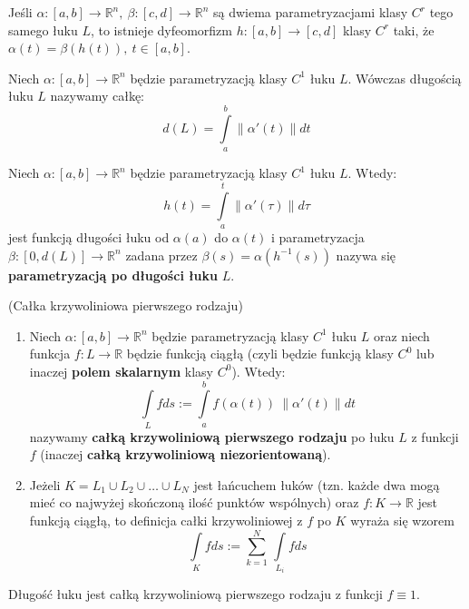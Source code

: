 \begin{tw}
	Jeśli $\alpha:[a,b]\rightarrow \mathbb{R}^{n},\ \beta:[c,d]\rightarrow \mathbb{R}^{n}$ są dwiema parametryzacjami klasy $C^{r}$ tego samego łuku $L$, to istnieje dyfeomorfizm $h:[a,b]\rightarrow [c,d]$ klasy $C^{r}$ taki, że $\alpha(t)=\beta(h(t)),\ t\in [a,b]$.
\end{tw}

\begin{tw}
	Niech $\alpha:[a,b]\rightarrow \mathbb{R}^{n}$ będzie parametryzacją klasy $C^{1}$ łuku $L$. Wówczas długością łuku $L$ nazywamy całkę: $$d(L)=\int\limits_{a}^{b}\|\alpha'(t)\|dt$$
\end{tw}

\begin{df}
	Niech $\alpha:[a,b]\rightarrow \mathbb{R}^{n}$ będzie parametryzacją klasy $C^{1}$ łuku $L$. Wtedy: $$h(t)=\int\limits_{a}^{t}\|\alpha'(\tau)\|d\tau$$ jest funkcją długości łuku od $\alpha(a)$ do $\alpha(t)$ i parametryzacja
	$\beta:[0,d(L)]\rightarrow \mathbb{R}^{n}$ zadana przez $\beta(s)=\alpha(h^{-1}(s))$ nazywa się \textbf{parametryzacją po długości łuku} $L$.
\end{df}

\begin{df}{(Całka krzywoliniowa pierwszego rodzaju)}
	\begin{enumerate}
		\item
		Niech $\alpha:[a,b]\rightarrow \mathbb{R}^{n}$ będzie parametryzacją klasy $C^{1}$ łuku $L$ oraz niech funkcja $f:L\rightarrow \mathbb{R}$ będzie funkcją ciągłą (czyli będzie funkcją klasy $C^{0}$ lub inaczej \textbf{polem skalarnym} klasy $C^{0}$). Wtedy:
		$$\int\limits_L fds:=\int\limits_{a}^{b}f(\alpha(t))\ \|\alpha'(t)\|dt$$ nazywamy \textbf{całką krzywoliniową pierwszego rodzaju} po łuku $L$ z funkcji $f$ (inaczej \textbf{całką krzywoliniową niezorientowaną}).
		\item
		Jeżeli $K=L_1\cup L_2\cup \ldots \cup L_N$ jest łańcuchem łuków (tzn. każde dwa mogą mieć co najwyżej skończoną ilość punktów wspólnych) oraz $f:K\rightarrow \mathbb{R}$ jest funkcją ciągłą, to definicja całki krzywoliniowej z $f$ po $K$ wyraża się wzorem $$\int\limits_K fds:=\sum_{k=1}^{N}\,\int\limits_{L_{i}}fds$$
	\end{enumerate}
\end{df}

\begin{uwg}
	Długość łuku jest całką krzywoliniową pierwszego rodzaju z funkcji $f\equiv1$.
\end{uwg}

